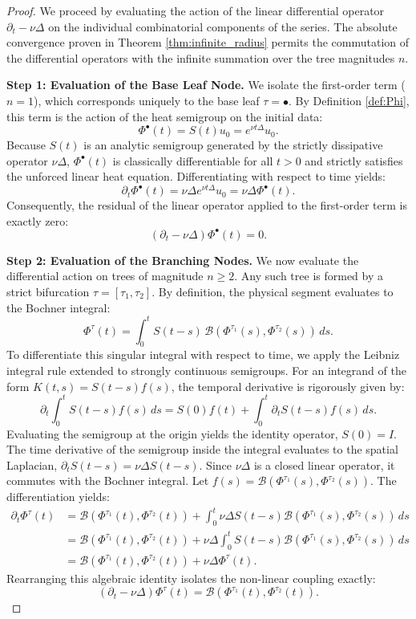 \documentclass[12pt,a4paper]{article}
\theoremstyle{plain}
\theoremstyle{definition}
\theoremstyle{remark}
\newcommand{\BB}{\mathcal{B}}
\begin{document}
\begin{proof}
We proceed by evaluating the action of the linear differential operator $\partial_t - \nu\Delta$ on the individual combinatorial components of the series. The absolute convergence proven in Theorem \ref{thm:infinite_radius} permits the commutation of the differential operators with the infinite summation over the tree magnitudes $n$.

\textbf{Step 1: Evaluation of the Base Leaf Node.}
We isolate the first-order term ($n=1$), which corresponds uniquely to the base leaf $\tau = \bullet$. By Definition \ref{def:Phi}, this term is the action of the heat semigroup on the initial data:
\[
  \Phi^\bullet(t) = S(t)u_0 = e^{\nu t \Delta}u_0.
\]
Because $S(t)$ is an analytic semigroup generated by the strictly dissipative operator $\nu\Delta$, $\Phi^\bullet(t)$ is classically differentiable for all $t > 0$ and strictly satisfies the unforced linear heat equation. Differentiating with respect to time yields:
\[
  \partial_t \Phi^\bullet(t) = \nu \Delta e^{\nu t \Delta}u_0 = \nu \Delta \Phi^\bullet(t).
\]
Consequently, the residual of the linear operator applied to the first-order term is exactly zero:
\begin{equation}
  (\partial_t - \nu \Delta) \Phi^\bullet(t) = 0. \label{eq:diff_base}
\end{equation}

\textbf{Step 2: Evaluation of the Branching Nodes.}
We now evaluate the differential action on trees of magnitude $n \ge 2$. Any such tree is formed by a strict bifurcation $\tau = [\tau_1, \tau_2]$. By definition, the physical segment evaluates to the Bochner integral:
\[
  \Phi^\tau(t) = \int_0^t S(t-s)\,\BB(\Phi^{\tau_1}(s), \Phi^{\tau_2}(s))\,ds.
\]
To differentiate this singular integral with respect to time, we apply the Leibniz integral rule extended to strongly continuous semigroups. For an integrand of the form $K(t,s) = S(t-s)f(s)$, the temporal derivative is rigorously given by:
\[
  \partial_t \int_0^t S(t-s)f(s)\,ds = S(0)f(t) + \int_0^t \partial_t S(t-s)f(s)\,ds.
\]
Evaluating the semigroup at the origin yields the identity operator, $S(0) = I$. The time derivative of the semigroup inside the integral evaluates to the spatial Laplacian, $\partial_t S(t-s) = \nu\Delta S(t-s)$. Since $\nu\Delta$ is a closed linear operator, it commutes with the Bochner integral. Let $f(s) = \BB(\Phi^{\tau_1}(s), \Phi^{\tau_2}(s))$. The differentiation yields:
\begin{align*}
  \partial_t \Phi^\tau(t) 
  &= \BB(\Phi^{\tau_1}(t), \Phi^{\tau_2}(t)) + \int_0^t \nu\Delta S(t-s)\BB(\Phi^{\tau_1}(s), \Phi^{\tau_2}(s))\,ds \\
  &= \BB(\Phi^{\tau_1}(t), \Phi^{\tau_2}(t)) + \nu\Delta \int_0^t S(t-s)\BB(\Phi^{\tau_1}(s), \Phi^{\tau_2}(s))\,ds \\
  &= \BB(\Phi^{\tau_1}(t), \Phi^{\tau_2}(t)) + \nu\Delta \Phi^\tau(t).
\end{align*}
Rearranging this algebraic identity isolates the non-linear coupling exactly:
\begin{equation}
  (\partial_t - \nu \Delta) \Phi^\tau(t) = \BB(\Phi^{\tau_1}(t), \Phi^{\tau_2}(t)). \label{eq:diff_node}
\end{equation}


\end{proof}
\end{document}
